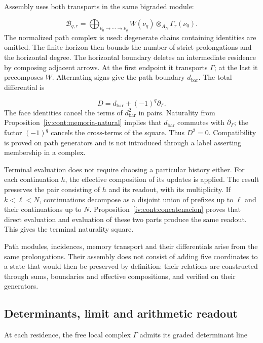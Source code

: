 Assembly uses both transports in the same bigraded module:

\[
\mathcal B_{q,r}=
\bigoplus_{\nu_0\to\cdots\to\nu_q}
W(\nu_q)\otimes_{A_N}\Gamma_r(\nu_0).
\]
The normalized path complex is used: degenerate chains containing identities are omitted. The finite horizon then bounds the number of strict prolongations and the horizontal degree. The horizontal boundary deletes an intermediate residence by composing adjacent arrows. At the first endpoint it transports \(\Gamma\); at the last it precomposes \(W\). Alternating signs give the path boundary \(d_{\mathrm{bar}}\). The total differential is

\[
D=d_{\mathrm{bar}}+(-1)^q\partial_\Gamma.
\]
The face identities cancel the terms of \(d_{\mathrm{bar}}^2\) in pairs. Naturality from Proposition~\ref{iv:cont:memoria-natural} implies that \(d_{\mathrm{bar}}\) commutes with \(\partial_\Gamma\); the factor \((-1)^q\) cancels the cross-terms of the square. Thus \(D^2=0\). Compatibility is proved on path generators and is not introduced through a label asserting membership in a complex.

Terminal evaluation does not require choosing a particular history either. For each continuation \(h\), the effective composition of its updates is applied. The result preserves the pair consisting of \(h\) and its readout, with its multiplicity. If \(k<\ell<N\), continuations decompose as a disjoint union of prefixes up to \(\ell\) and their continuations up to \(N\). Proposition~\ref{iv:cont:concatenacion} proves that direct evaluation and evaluation of these two parts produce the same readout. This gives the terminal naturality square.

Path modules, incidences, memory transport and their differentials arise from the same prolongations. Their assembly does not consist of adding five coordinates to a state that would then be preserved by definition: their relations are constructed through sums, boundaries and effective compositions, and verified on their generators.

\subsection{Determinants, limit and arithmetic readout}
\label{iv:cont:determinantes}
At each residence, the free local complex \(\Gamma\) admits its graded determinant line

